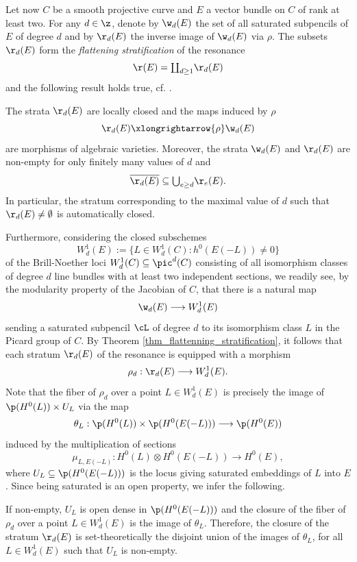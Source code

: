 \documentclass[10pt, leqno]{amsart}
\begin{document}
\medskip

Let now $C$ be a smooth projective curve and $E$ a vector bundle on $C$ of rank at least two. 
For any $d \in \z$, denote by $\w_d(E)$ the set of all saturated subpencils of $E$ of degree $d$ and by $\r_d(E)$ the inverse image of $\w_d(E)$ via $\rho$. 
The subsets $\r_d(E)$ form the \emph{flattening stratification} of the resonance
\[
\r(E) = \textstyle{\coprod_{d \ge 1}} \r_d(E)
\]
and the following result holds true, cf. \cite[Theorem 3.5]{aprodu_linear_2025}.

\begin{thm} \label{thm_flattenning_stratification}
The strata $\r_d(E)$ are locally closed and the maps induced by $\rho$
\[
\r_d(E) \xlongrightarrow{\rho} \w_d(E)
\]
are morphisms of algebraic varieties. Moreover, the strata $\w_d(E)$ and $\r_d(E)$ are non-empty for only finitely many values of $d$ and
\[
\overline{\r_d(E)} \subseteq \textstyle{\bigcup}_{e \ge d} \r_e(E).
\]
In particular, the stratum corresponding to the maximal value of $d$ such that $\r_d(E) \neq \emptyset$ is automatically closed.
\end{thm}

Furthermore, considering the closed subschemes
\[
W^1_d(E) := \{ L \in W^1_d(C) :  h^0(E(-L)) \neq 0 \}
\]
of the Brill-Noether loci $W^1_d(C) \subseteq \pic^d(C)$ consisting of all isomorphism classes of degree $d$ line bundles with at least two independent sections, we readily see, by the modularity property of the Jacobian of $C$, that there is a natural map
\[
\w_d(E) \longrightarrow W^1_d(E)
\]
sending a saturated subpencil $\cL$ of degree $d$ to its isomorphism class $L$ in the Picard group of $C$.
By Theorem \ref{thm_flattenning_stratification}, it follows that each stratum $\r_d(E)$ of the resonance is equipped with a morphism
\[
\rho_d : \r_d(E) \longrightarrow W^1_d(E).
\]
Note that the fiber of $\rho_d$ over a point $L \in W^1_d(E)$ is precisely the image of $\p(H^0(L)) \times U_L$ via the map
\[
\theta_L:\p(H^0(L))\times \p(H^0(E(-L))) \longrightarrow \p(H^0(E))
\]
induced by the multiplication of sections
\[
\mu_{L,E(-L)}:H^0(L)\otimes H^0(E(-L)) \longrightarrow H^0(E),
\]
where $U_L \subseteq \p(H^0(E(-L)))$ is the locus giving saturated embeddings of $L$ into $E$. 
Since being saturated is an open property, we infer the following.

\begin{rem} \label{rem:U_L}
If non-empty, $U_L$ is open dense in $\p(H^0(E(-L)))$ and the closure of the fiber of $\rho_d$ over a point $L \in W^1_d(E)$ is the image of $\theta_L$. Therefore, the closure of the stratum $\r_d(E)$ is set-theoretically the disjoint union of the images of $\theta_L$, for all $L \in W^1_d(E)$ such that $U_L$ is non-empty.
\end{rem}
\end{document}
